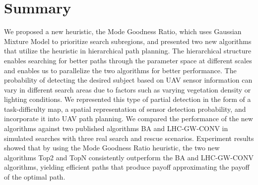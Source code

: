 \section{Summary} 
\label{sec:Summary}

We proposed a new heuristic, the Mode Goodness Ratio, which uses Gaussian Mixture Model to prioritize search subregions, and presented two new algorithms that utilize the heuristic in hierarchical path planning. The hierarchical structure enables searching for better paths through the parameter space at different scales and enables us to parallelize the two algorithms for better performance. The probability of detecting the desired subject based on UAV sensor information can vary in different search areas due to factors such as varying vegetation density or lighting conditions. We represented this type of partial detection in the form of a task-difficulty map, a spatial representation of sensor detection probability, and incorporate it into UAV path planning. We compared the performance of the new algorithms against two published algorithms BA and LHC-GW-CONV in simulated searches with three real search and rescue scenarios. Experiment results showed that by using the Mode Goodness Ratio heuristic, the two new algorithms Top2 and TopN consistently outperform the BA and LHC-GW-CONV algorithms, yielding efficient paths that produce payoff approximating the payoff of the optimal path.  
